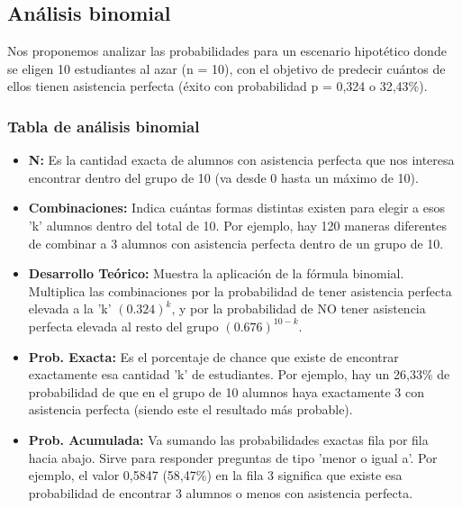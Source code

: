 \newpage
\subsection{Análisis binomial}
Nos proponemos analizar las probabilidades para un escenario hipotético donde se eligen 10
estudiantes al azar (n = 10), con el objetivo de predecir cuántos de ellos tienen asistencia
perfecta (éxito con probabilidad p = 0,324 o 32,43\%).

\subsubsection{Tabla de análisis binomial}


\begin{itemize}
	\item \textbf{N:} Es la cantidad exacta de alumnos con asistencia perfecta que nos
  interesa encontrar dentro del grupo de 10 (va desde 0 hasta un máximo de 10).
	\item \textbf{Combinaciones:} Indica cuántas formas distintas existen para elegir a esos 'k'
  alumnos dentro del total de 10. Por ejemplo, hay 120 maneras diferentes de combinar a 3 alumnos
  con asistencia perfecta dentro de un grupo de 10.
	\item \textbf{Desarrollo Teórico:} Muestra la aplicación de la fórmula binomial. Multiplica las
  combinaciones por la probabilidad de tener asistencia perfecta elevada a la 'k' $(0.324)^k$, y por
  la probabilidad de NO tener asistencia perfecta elevada al resto del grupo $(0.676)^{10-k}$.
	\item \textbf{Prob. Exacta:} Es el porcentaje de chance que existe de encontrar exactamente
  esa cantidad 'k' de estudiantes. Por ejemplo, hay un 26,33\% de probabilidad de que en el grupo de
  10 alumnos haya exactamente 3 con asistencia perfecta (siendo este el resultado más probable).
	\item \textbf{Prob. Acumulada:} Va sumando las probabilidades exactas fila por fila hacia
  abajo. Sirve para responder preguntas de tipo 'menor o igual a'. Por ejemplo, el valor 0,5847
  (58,47\%) en la fila 3 significa que existe esa probabilidad de encontrar 3 alumnos o menos con
  asistencia perfecta.
\end{itemize}

